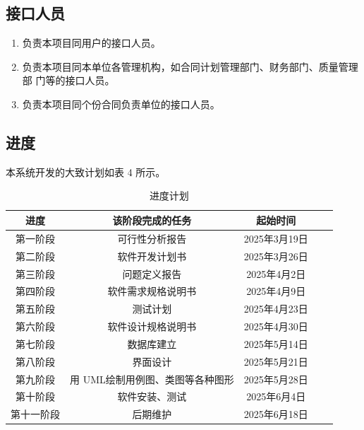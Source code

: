 \documentclass[
    report,     %
    oneside,    %
    UTF8,       %
    zihao=-4    %
]{config} %
\begin{document}
\subsection{接口人员}
\begin{enumerate}[label=(\arabic*)]
\item 负责本项目同用户的接口人员。
\item 负责本项目同本单位各管理机构，如合同计划管理部门、财务部门、质量管理部
门等的接口人员。
\item 负责本项目同个份合同负责单位的接口人员。
\end{enumerate}
\subsection{进度}
本系统开发的大致计划如表 4 所示。
\begin{table}[H] %
    \centering %
    \caption{进度计划} %
    \label{tab:progress} %
    \renewcommand\arraystretch{0.85} %
    \setlength{\tabcolsep}{12pt} %
    \begin{tabular}{ccccc} %
        \toprule[1.5pt] %
        \textbf{进度} & \textbf{该阶段完成的任务} & \textbf{起始时间} \\ %
        \midrule[0.8pt] %
        第一阶段 & 可行性分析报告 & 2025年3月19日 \\ %
        第二阶段 & 软件开发计划书 & 2025年3月26日 \\ %
        第三阶段 & 问题定义报告 & 2025年4月2日 \\ %
        第四阶段 & 软件需求规格说明书 & 2025年4月9日 \\ %
        第五阶段 & 测试计划 & 2025年4月23日 \\ %
        第六阶段 & 软件设计规格说明书 & 2025年4月30日 \\ %
        第七阶段 & 数据库建立 & 2025年5月14日 \\ %
        第八阶段 & 界面设计 & 2025年5月21日 \\ %
        第九阶段 & 用 UML绘制用例图、类图等各种图形 & 2025年5月28日 \\ %
        第十阶段 & 软件安装、测试 & 2025年6月4日 \\ %
        第十一阶段 & 后期维护 & 2025年6月18日 \\ %
        \hline\hline %
    \end{tabular}
\end{table}
\end{document}
